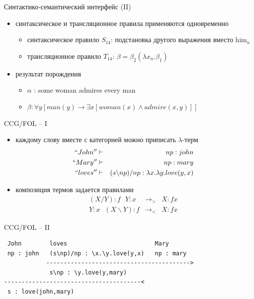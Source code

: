\documentclass{beamer}
\begin{document}
\begin{frame}{Синтактико-семантический интерфейс (II)}
\begin{small}
\begin{itemize}
	\item синтаксическое и трансляционное правила применяются одновременно
	\begin{itemize}
		\item синтаксическое правило $S_{14}$: подстановка другого выражения вместо him$_n$
		\item трансляционное правило $T_{14}$: $\beta = \beta_2(\lambda x_n . \beta_1)$
	\end{itemize}
	\item результат порождения 
	\begin{itemize}
		\item $\alpha$ : some woman admires every man
		\item $\beta : \forall y [man(y) \to \exists x [woman(x) \wedge admire(x,y)]]$
	\end{itemize}
\end{itemize}
\end{small}
\end{frame}

\begin{frame}{CCG/FOL -- I}
\begin{small}
  \begin{itemize}
    \item каждому слову вместе с категорией можно приписать $\lambda$-терм
      \begin{eqnarray*}
        ``John'' &\vdash& np : john \\
        ``Mary'' &\vdash& np : mary \\
        ``loves'' &\vdash& (s \backslash np) / np : \lambda x.\lambda y.love(y,x)
      \end{eqnarray*}
    \item композиция термов задается правилами
      \begin{eqnarray*}
        (X / Y) : f~~~Y : x &\rightarrow_{>}& X : fx \\
        Y : x~~~(X \backslash Y) : f &\rightarrow_{<}& X : fx
      \end{eqnarray*}
  \end{itemize}
\end{small}  
\end{frame} 

\begin{frame}[fragile]{CCG/FOL -- II}
\begin{verbatim}
 John        loves                         Mary
 np : john   (s\np)/np : \x.\y.love(y,x)   np : mary
            ----------------------------------------->
             s\np : \y.love(y,mary)
---------------------------------------<
 s : love(john,mary)
\end{verbatim}
\end{frame} 
\end{document}
